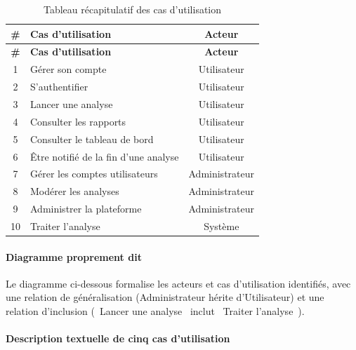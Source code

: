 \begin{longtable}{clc}
  \caption{Tableau r\'ecapitulatif des cas d'utilisation}
  \label{tab:recap-cu} \\
  \toprule
  \textbf{\#} & \textbf{Cas d'utilisation} & \textbf{Acteur} \\
  \midrule
  \endfirsthead
  \toprule
  \textbf{\#} & \textbf{Cas d'utilisation} & \textbf{Acteur} \\
  \midrule
  \endhead
  1 & G\'erer son compte & Utilisateur \\
  2 & S'authentifier & Utilisateur \\
  3 & Lancer une analyse & Utilisateur \\
  4 & Consulter les rapports & Utilisateur \\
  5 & Consulter le tableau de bord & Utilisateur \\
  6 & \^Etre notifi\'e de la fin d'une analyse & Utilisateur \\
  7 & G\'erer les comptes utilisateurs & Administrateur \\
  8 & Mod\'erer les analyses & Administrateur \\
  9 & Administrer la plateforme & Administrateur \\
  10 & Traiter l'analyse & Syst\`eme \\
  \bottomrule
\end{longtable}

\paragraph{Diagramme proprement dit}

Le diagramme ci-dessous formalise les acteurs et cas d'utilisation identifi\'es,
avec une relation de g\'en\'eralisation (Administrateur h\'erite d'Utilisateur) et
une relation d'inclusion (\og~Lancer une analyse~\fg{} inclut \og~Traiter
l'analyse~\fg).


\paragraph{Description textuelle de cinq cas d'utilisation}

